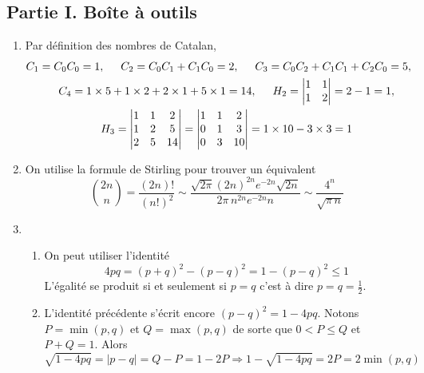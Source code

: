 \subsection*{Partie I. Boîte à outils}
\begin{enumerate}
  \item Par définition des nombres de Catalan,
\begin{multline*}
C_1 = C_0C_0 = 1,\hspace{0.5cm}
C_2 = C_0C_1+C_1C_0 = 2,\hspace{0.5cm}
C_3 = C_0C_2 + C_1C_1 + C_2C_0 = 5,\hspace{0.5cm}\\
C_4 = 1\times 5 + 1\times 2 + 2\times1 + 5\times 1 = 14,\hspace{0.5cm}
H_2=
\begin{vmatrix}
1 & 1 \\ 1 & 2  
\end{vmatrix}
=2-1=1,\\
H_3=
\begin{vmatrix}
1 & 1 & 2 \\ 1 & 2 & 5 \\ 2 & 5 & 14  
\end{vmatrix}
=
\begin{vmatrix}
1 & 1 & 2 \\ 0 & 1 & 3 \\ 0 & 3 & 10  
\end{vmatrix}
=1\times 10 - 3\times 3 = 1
\end{multline*}

\item On utilise la formule de Stirling pour trouver un équivalent
\begin{displaymath}
\binom{2n}{n}=\frac{(2n)!}{(n!)^2}
\sim \frac{\sqrt{2\pi}(2n)^{2n}e^{-2n}\sqrt{2n}}{2\pi\,n^{2n}e^{-2n}n}
\sim \frac{4^n}{\sqrt{\pi\,n}}
\end{displaymath}

\item
\begin{enumerate}
  \item On peut utiliser l'identité
\begin{displaymath}
  4pq = (p+q)^2-(p-q)^2 = 1-(p-q)^2\leq 1
\end{displaymath}
L'égalité se produit si et seulement si $p=q$ c'est à dire $p=q=\frac{1}{2}$.
  \item L'identité précédente s'écrit encore $(p-q)^2 = 1-4pq$. Notons $P=\min(p,q)$ et $Q=\max(p,q)$ de sorte que $0<P\leq Q$ et $P+Q=1$. Alors
\begin{displaymath}
\sqrt{1-4pq} = |p-q| = Q-P=1-2P \Rightarrow 1-\sqrt{1-4pq} = 2P = 2\min(p,q)
\end{displaymath}
\end{enumerate}


\end{enumerate}
